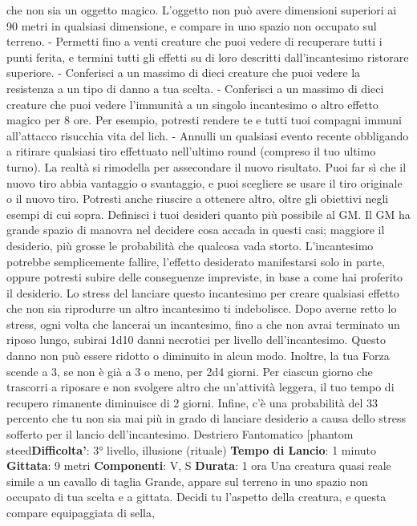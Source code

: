 \begin{multicols}{2}
che non sia un oggetto magico. L’oggetto non può
avere dimensioni superiori ai 90 metri in qualsiasi
dimensione, e compare in uno spazio non occupato
sul terreno.
- Permetti fino a venti creature che puoi vedere di
recuperare tutti i punti ferita, e termini tutti gli effetti
su di loro descritti dall’incantesimo ristorare
superiore.
- Conferisci a un massimo di dieci creature che puoi
vedere la resistenza a un tipo di danno a tua scelta.
- Conferisci a un massimo di dieci creature che puoi
vedere l’immunità a un singolo incantesimo o altro
effetto magico per 8 ore. Per esempio, potresti
rendere te e tutti tuoi compagni immuni all’attacco
risucchia vita del lich.
- Annulli un qualsiasi evento recente obbligando a
ritirare qualsiasi tiro effettuato nell’ultimo round
(compreso il tuo ultimo turno). La realtà si rimodella
per assecondare il nuovo risultato. Puoi far sì che il
nuovo tiro abbia vantaggio o svantaggio, e puoi
scegliere se usare il tiro originale o il nuovo tiro.
Potresti anche riuscire a ottenere altro, oltre gli obiettivi
negli esempi di cui sopra. Definisci i tuoi desideri
quanto più possibile al GM. Il GM ha grande spazio di
manovra nel decidere cosa accada in questi casi;
maggiore il desiderio, più grosse le probabilità che
qualcosa vada storto. L’incantesimo potrebbe
semplicemente fallire, l’effetto desiderato manifestarsi
solo in parte, oppure potresti subire delle conseguenze
impreviste, in base a come hai proferito il desiderio.
Lo stress del lanciare questo incantesimo per creare
qualsiasi effetto che non sia riprodurre un altro
incantesimo ti indebolisce. Dopo averne retto lo stress,
ogni volta che lancerai un incantesimo, fino a che non
avrai terminato un riposo lungo, subirai 1d10 danni
necrotici per livello dell’incantesimo. Questo danno non
può essere ridotto o diminuito in alcun modo. Inoltre, la
tua Forza scende a 3, se non è già a 3 o meno, per 2d4
giorni. Per ciascun giorno che trascorri a riposare e non
svolgere altro che un’attività leggera, il tuo tempo di
recupero rimanente diminuisce di 2 giorni. Infine, c’è
una probabilità del 33 percento che tu non sia mai più in
grado di lanciare desiderio a causa dello stress sofferto
per il lancio dell’incantesimo.
Destriero Fantomatico
[phantom steed\textbf{Difficolta'}:
3° livello, illusione (rituale)
\textbf{Tempo di Lancio}: 1 minuto
\textbf{Gittata}: 9 metri
\textbf{Componenti}: V, S
\textbf{Durata}: 1 ora
Una creatura quasi reale simile a un cavallo di taglia
Grande, appare sul terreno in uno spazio non occupato
di tua scelta e a gittata. Decidi tu l’aspetto della
creatura, e questa compare equipaggiata di sella,

\end{multicols}
